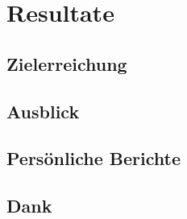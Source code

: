 \chapter{Resultate}
\label{tb-resultate}

\section{Zielerreichung}


\section{Ausblick}


\section{Persönliche Berichte}


\section{Dank}

